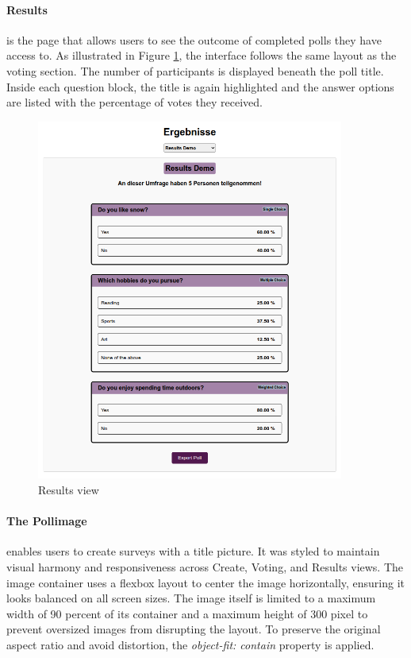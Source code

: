 \documentclass[a4paper,12pt]{report}
\begin{document}
\paragraph{Results} is the page that allows users to see the outcome of completed polls they have access to. As illustrated in Figure \ref{fig:results_view}, the interface follows the same layout as the voting section. The number of participants is displayed beneath the poll title. Inside each question block, the title is again highlighted and the answer options are listed with the percentage of votes they received.
\begin{figure}[H]
	\centering
	\includegraphics[width=0.9\textwidth]{pics/results_view.png}
	\caption{Results view}
	\label{fig:results_view}
\end{figure}
\paragraph{The Pollimage} enables users to create surveys with a title picture. It was styled to maintain visual harmony and responsiveness across Create, Voting, and Results views. The image container uses a flexbox layout to center the image horizontally, ensuring it looks balanced on all screen sizes. The image itself is limited to a maximum width of 90 percent of its container and a maximum height of 300 pixel to prevent oversized images from disrupting the layout. To preserve the original aspect ratio and avoid distortion, the \textit{object-fit: contain} property is applied. \parencite{cssobjectfit} \\ \\
\end{document}
